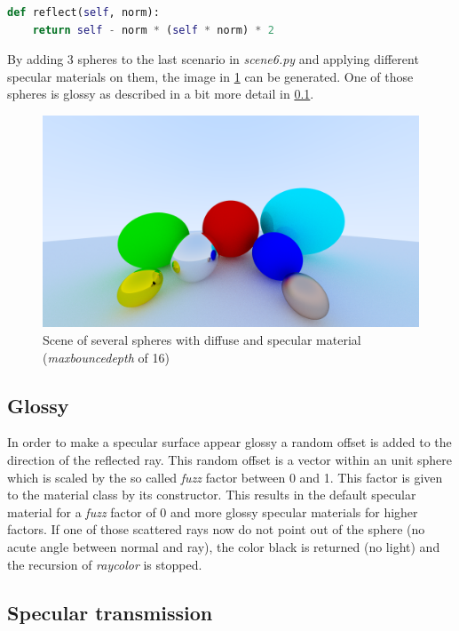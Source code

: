 \documentclass[]{article}
\begin{document}
		\begin{lstlisting}[caption={Function reflecting a vector on a normal vector}, language=Python, label=lst:reflect]
def reflect(self, norm):
	return self - norm * (self * norm) * 2
		\end{lstlisting}
		
		By adding 3 spheres to the last scenario in \emph{scene6.py} and applying different specular materials on them, the image in \cref{fig:image6} can be generated. One of those spheres is glossy as described in a bit more detail in \cref{sec:glossy}.
		
		\begin{figure}[h]
			\centering
			\includegraphics[width=0.9\linewidth]{image6-5}
			\caption{Scene of several spheres with diffuse and specular material  (\emph{max\textunderscore bounce\textunderscore depth} of 16)}
			\label{fig:image6}
		\end{figure}
	
		\subsection{Glossy}
		\label{sec:glossy}
		In order to make a specular surface appear glossy a random offset is added to the direction of the reflected ray. This random offset is a vector within an unit sphere which is scaled by the so called \emph{fuzz} factor between 0 and 1. This factor is given to the material class by its constructor. This results in the default specular material for a \emph{fuzz} factor of 0 and more glossy specular materials for higher factors. If one of those scattered rays now do not point out of the sphere (no acute angle between normal and ray), the color black is returned (no light) and the recursion of \emph{ray\textunderscore color} is stopped.
	
		\subsection{Specular transmission}
		
\end{document}
